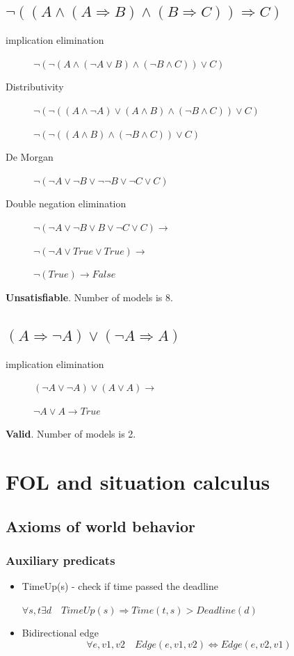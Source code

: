 \documentclass{article}                     %
\newcommand{\nt}[1]{\neg #1}
\begin{document}
	\subsection{$ \neg ((A \land (A \Rightarrow B) \land (B \Rightarrow C)) \Rightarrow C )$}
	\begin{description}
		\item[implication elimination] 	$ \neg (\neg(A \land (\nt{A} \lor B) \land (\nt{B} \land C)) \lor C )$
		\item[Distributivity]  $ \neg (\neg((A \land \nt{A}) \lor (A \land B) \land (\nt{B} \land C)) \lor C )$
		
		$ \neg (\neg((A \land B) \land (\nt{B} \land C)) \lor C )$
		\item[De Morgan] 		$ \neg (\nt{A} \lor \nt{B} \lor \nt{\nt{B}} \lor \nt{C} \lor C )$
		\item[Double negation elimination] $ \neg (\nt{A} \lor \nt{B} \lor B \lor \nt{C} \lor C ) \rightarrow $
		
		$ \neg (\nt{A} \lor True \lor True ) \rightarrow$
		
		$ \neg (True) \rightarrow False$
	\end{description}

	\textbf{Unsatisfiable}.  Number of models is 8.
	
	\subsection{$ (A\Rightarrow \nt{A}) \lor (\nt{A} \Rightarrow A) $}
		\begin{description}
		\item[implication elimination] $ (\nt{A} \lor \nt{A}) \lor (A \lor A) \rightarrow $
		
		$ \nt{A} \lor A \rightarrow True$
		
	\end{description}

	\textbf{Valid}.  Number of models is 2.
	
	
	\section{FOL and situation calculus}		

	\subsection{Axioms of world behavior}
	
	\subsubsection{Auxiliary predicats }
	\begin{itemize}
		\item TimeUp(s) - check if time passed the deadline
		
		$ \forall s, t \exists d \quad TimeUp(s) \Rightarrow Time(t, s) > Deadline(d) $
		
		\item Bidirectional edge
		$$ \forall e, v1, v2 \quad Edge(e, v1, v2) \Leftrightarrow Edge(e, v2, v1) $$
		
	\end{itemize}
\end{document}
